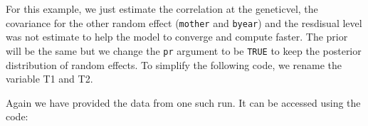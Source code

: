 \documentclass[
  12pt,
]{book}
\newenvironment{Shaded}{\begin{snugshade}}{\end{snugshade}}
\newcommand{\CommentTok}[1]{\textcolor[rgb]{0.56,0.35,0.01}{\textit{#1}}}
\newcommand{\DataTypeTok}[1]{\textcolor[rgb]{0.13,0.29,0.53}{#1}}
\newcommand{\DecValTok}[1]{\textcolor[rgb]{0.00,0.00,0.81}{#1}}
\newcommand{\FloatTok}[1]{\textcolor[rgb]{0.00,0.00,0.81}{#1}}
\newcommand{\KeywordTok}[1]{\textcolor[rgb]{0.13,0.29,0.53}{\textbf{#1}}}
\newcommand{\NormalTok}[1]{#1}
\newcommand{\OperatorTok}[1]{\textcolor[rgb]{0.81,0.36,0.00}{\textbf{#1}}}
\newcommand{\OtherTok}[1]{\textcolor[rgb]{0.56,0.35,0.01}{#1}}
\newcommand{\StringTok}[1]{\textcolor[rgb]{0.31,0.60,0.02}{#1}}
\begin{document}
For this example, we just estimate the correlation at the geneticvel, the covariance for the other random effect (\texttt{mother} and \texttt{byear}) and the resdisual level was not estimate to help the model to converge and compute faster. The prior will be the same but we change the \texttt{pr} argument to be \texttt{TRUE} to keep the posterior distribution of random effects.
To simplify the following code, we rename the variable T1 and T2.

\begin{Shaded}
\end{Shaded}

Again we have provided the data from one such run. It can be accessed using the code:
\end{document}
